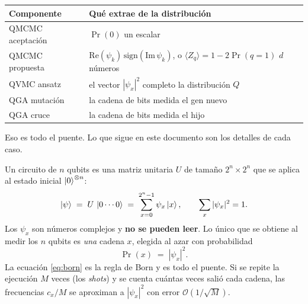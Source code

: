 \documentclass[11pt,a4paper]{article}
\begin{document}
\begin{center}
\small
\begin{tabular}{ll}
\toprule
\textbf{Componente} & \textbf{Qué extrae de la distribución} \\
\midrule
QMCMC aceptación & $\Pr(0)$ \hfill un escalar \\
QMCMC propuesta  & $\mathrm{Re}(\psi_k)\,\mathrm{sign}(\mathrm{Im}\,\psi_k)$,
                   o $\langle Z_q\rangle = 1-2\Pr(q{=}1)$ \hfill $d$ números \\
QVMC ansatz      & el vector $|\psi_x|^2$ completo \hfill la distribución $Q$ \\
QGA mutación     & la cadena de bits medida \hfill el gen nuevo \\
QGA cruce        & la cadena de bits medida \hfill el hijo \\
\bottomrule
\end{tabular}
\end{center}

\noindent
Eso es todo el puente. Lo que sigue en este documento son los detalles de
cada caso.

Un circuito de $n$ qubits es una matriz unitaria $U$ de tamaño $2^n\times 2^n$
que se aplica al estado inicial $\ket{0}^{\otimes n}$:
\begin{equation}
  \ket{\psi} \;=\; U\,\ket{0\cdots 0}
  \;=\; \sum_{x=0}^{2^n-1} \psi_x \ket{x},
  \qquad \sum_x |\psi_x|^2 = 1 .
\end{equation}
Los $\psi_x$ son números complejos y \textbf{no se pueden leer}. Lo único que
se obtiene al medir los $n$ qubits es \emph{una} cadena $x$, elegida al azar
con probabilidad
\begin{equation}
  \label{eq:born}
  \Pr(x) \;=\; |\psi_x|^2 .
\end{equation}
La ecuación \eqref{eq:born} es la regla de Born y es todo el puente. Si se
repite la ejecución $M$ veces (los \emph{shots}) y se cuenta cuántas veces
salió cada cadena, las frecuencias $c_x/M$ se aproximan a $|\psi_x|^2$ con
error $\mathcal{O}(1/\sqrt{M})$.

\begin{center}
\end{center}
\end{document}
